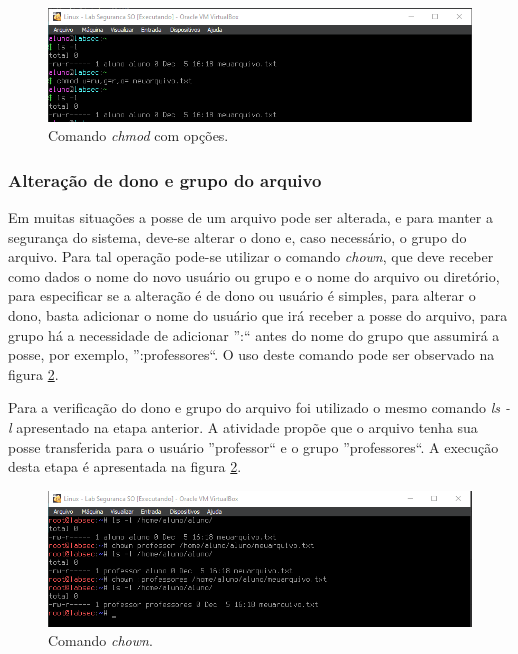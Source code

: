\documentclass[
	12pt,				%
	oneside,   	        %
	a4paper,			%
	english,			%
	french,				%
	spanish,			%
	brazil,				%
	]{pacotes/abntex2}
\begin{document}
\begin{figure}[H]
  \centering
  \includegraphics[scale=0.7]{figuras/chmod_ugoa.png}
  \caption{Comando \textit{chmod} com opções.}
  \label{fig:chmod_ugoa}
\end{figure}

\subsubsection{Alteração de dono e grupo do arquivo}
Em muitas situações a posse de um arquivo pode ser alterada, e para manter a segurança do sistema, deve-se alterar o dono e, caso necessário, o grupo do arquivo. Para tal operação pode-se utilizar o comando \textit{chown}, que deve receber como dados o nome do novo usuário ou grupo e o nome do arquivo ou diretório, para especificar se a alteração é de dono ou usuário é simples, para alterar o dono, basta adicionar o nome do usuário que irá receber a posse do arquivo, para grupo há a necessidade de adicionar '':`` antes do nome do grupo que assumirá a posse, por exemplo, '':professores``. O uso deste comando pode ser observado na figura \ref{fig:chown}.

Para a verificação do dono e grupo do arquivo foi utilizado o mesmo comando \textit{ls -l} apresentado na etapa anterior. A atividade propõe que o arquivo tenha sua posse transferida para o usuário ''professor`` e o grupo ''professores``. A execução desta etapa é apresentada na figura \ref{fig:chown}.
\begin{figure}[H]
  \centering
  \includegraphics[scale=0.7]{figuras/chown.png}
  \caption{Comando \textit{chown}.}
  \label{fig:chown}
\end{figure}
\end{document}
